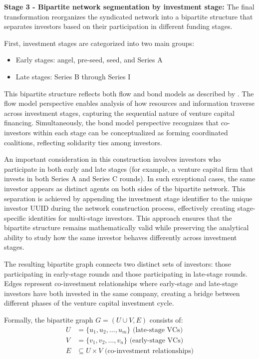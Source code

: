 \textbf{Stage 3 - Bipartite network segmentation by investment stage:}
The final transformation reorganizes the syndicated network into a bipartite structure that separates investors based on their participation in different funding stages. 

First, investment stages are categorized into two main groups:
\begin{itemize}
    \item Early stages: angel, pre-seed, seed, and Series A
    \item Late stages: Series B through Series I
\end{itemize}

This bipartite structure reflects both flow and bond models as described by \cite{Borgatti2011}. The flow model perspective enables analysis of how resources and information traverse across investment stages, capturing the sequential nature of venture capital financing. Simultaneously, the bond model perspective recognizes that co-investors within each stage can be conceptualized as forming coordinated coalitions, reflecting solidarity ties among investors.

An important consideration in this construction involves investors who participate in both early and late stages (for example, a venture capital firm that invests in both Series A and Series C rounds). In such exceptional cases, the same investor appears as distinct agents on both sides of the bipartite network. This separation is achieved by appending the investment stage identifier to the unique investor UUID during the network construction process, effectively creating stage-specific identities for multi-stage investors. This approach ensures that the bipartite structure remains mathematically valid while preserving the analytical ability to study how the same investor behaves differently across investment stages.

The resulting bipartite graph connects two distinct sets of investors: those participating in early-stage rounds and those participating in late-stage rounds. Edges represent co-investment relationships where early-stage and late-stage investors have both invested in the same company, creating a bridge between different phases of the venture capital investment cycle.

Formally, the bipartite graph $G = (U \cup V, E)$ consists of:
\begin{align}
U &= \{u_1, u_2, \ldots, u_m\} \text{ (late-stage VCs)} \\
V &= \{v_1, v_2, \ldots, v_n\} \text{ (early-stage VCs)} \\
E &\subseteq U \times V \text{ (co-investment relationships)}
\end{align}

